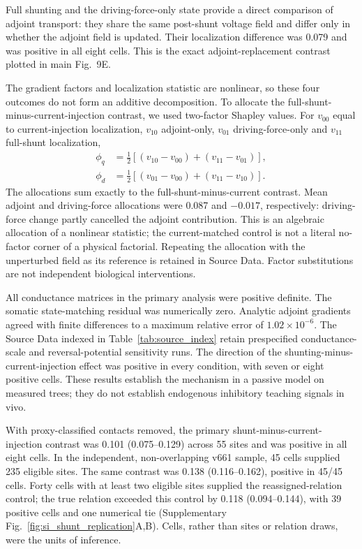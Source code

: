 Full shunting and the driving-force-only state provide a direct comparison
of adjoint transport: they share the same post-shunt voltage field and differ
only in whether the adjoint field is updated. Their localization difference was 0.079 and was positive in all
eight cells. This is the exact adjoint-replacement contrast plotted in main
Fig.~9E.

The gradient factors and localization statistic are nonlinear, so these four
outcomes do not form an additive decomposition. To allocate the
full-shunt-minus-current-injection contrast, we used two-factor Shapley values.
For $v_{00}$ equal to current-injection localization, $v_{10}$ adjoint-only,
$v_{01}$ driving-force-only and $v_{11}$ full-shunt localization,
\begin{align}
\phi_q&=\tfrac12[(v_{10}-v_{00})+(v_{11}-v_{01})],\\
\phi_d&=\tfrac12[(v_{01}-v_{00})+(v_{11}-v_{10})].
\end{align}
The allocations sum exactly to the full-shunt-minus-current contrast. Mean adjoint and driving-force allocations were 0.087 and $-0.017$, respectively: driving-force change partly cancelled the adjoint contribution. This is an algebraic allocation of a nonlinear statistic; the current-matched control is not a literal no-factor corner of a physical factorial. Repeating the allocation with the unperturbed field as its reference is retained in Source Data. Factor substitutions are not independent biological interventions.

All conductance matrices in the primary analysis were positive definite. The
somatic state-matching residual was numerically zero. Analytic adjoint gradients agreed
with finite differences to a maximum relative error of
$1.02\times10^{-6}$. The Source Data indexed in Table~\ref{tab:source_index} retain prespecified
conductance-scale and reversal-potential sensitivity runs. The direction of
the shunting-minus-current-injection effect was positive in every condition,
with seven or eight positive cells. These results establish the mechanism in a passive model on measured trees;
they do not establish endogenous inhibitory teaching signals in vivo.

With proxy-classified contacts removed, the primary
shunt-minus-current-injection contrast was 0.101 (0.075--0.129) across 55 sites
and was positive in all eight cells. In the independent, non-overlapping v661
sample, 45 cells supplied 235 eligible sites. The same contrast was 0.138
(0.116--0.162), positive in 45/45 cells. Forty cells
with at least two eligible sites supplied the reassigned-relation control; the
true relation exceeded this control by 0.118 (0.094--0.144), with
39 positive cells and one numerical tie (Supplementary
Fig.~\ref{fig:si_shunt_replication}A,B). Cells, rather than
sites or relation draws, were the
units of inference.

